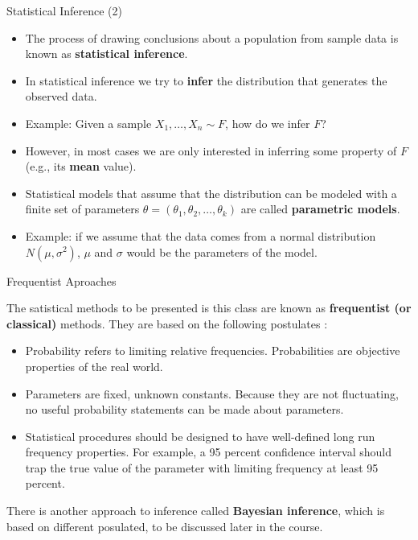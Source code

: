 \documentclass[handout]{beamer}
\begin{document}
\begin{frame}{Statistical Inference (2)}
\scriptsize{
\begin{itemize}
 \item The process of drawing conclusions about a population from sample data is known as \textbf{statistical inference}.
\item In statistical inference we try to \textbf{infer} the distribution that generates the observed data.
\item Example: Given a sample $X_1, \dots, X_n \sim F$, how do we infer $F$? 
\item However, in most cases we are only interested in inferring some property of $F$ (e.g., its \textbf{mean} value).
\item Statistical models that assume that the distribution can be modeled with a finite set of parameters $\theta= (\theta_{1},\theta_{2},\dots,\theta_{k})$ are called \textbf{parametric models}. 
\item Example: if we assume that the data comes from a normal distribution $N(\mu,\sigma^2)$, $\mu$ and $\sigma$ would be the parameters of the model. 
\end{itemize}

} 
\end{frame}


\begin{frame}{Frequentist Aproaches}
\scriptsize{
The satistical methods to be presented is this class are known as \textbf{frequentist (or classical)} methods. They are based on the following postulates  \cite{wasserman2013all}:
\begin{itemize}
\item Probability refers to limiting relative frequencies. Probabilities are objective properties of the real world.
\item Parameters are fixed, unknown constants. Because they are not fluctuating, no useful probability statements can be made about parameters.
\item Statistical procedures should be designed to have well-defined long run frequency properties. For example, a 95 percent confidence interval should trap the true value of the parameter with limiting frequency at least 95 percent.
\end{itemize}
There is another approach to inference called \textbf{Bayesian inference}, which is based on different posulated, to be discussed later in the course.

} 
\end{frame}
\end{document}
